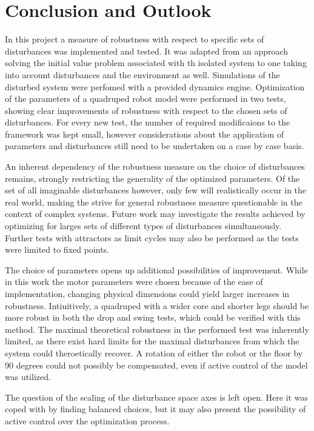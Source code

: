 \chapter{Conclusion and Outlook}


In this project a measure of robustness with respect to specific sets of disturbances was implemented and tested. It was adapted from an approach solving the initial value problem associated with th isolated system to one taking into account disturbances and the environment as well. Simulations of the disturbed system were perfomed with a provided dynamics engine. Optimization of the parameters of a quadruped robot model were performed in two tests, showing clear improvements of robustness with respect to the chosen sets of disturbances. 
For every new test, the number of required modificaions to the framework was kept small, however considerations about the application of parameters and disturbances still need to be undertaken on a case by case basis. 

An inherent dependency of the robustness measure on the choice of disturbances remains, strongly restricting the generality of the optimized parameters. Of the set of all imaginable disturbances however, only few will realistically occur in the real world, making the strive for general robustness measure questionable in the context of complex systems. Future work may investigate the results achieved by optimizing for larges sets of different types of disturbances simultaneously. Further tests with attractors as limit cycles may also be performed as the tests were limited to fixed points. 

The choice of parameters opens up additional possibilities of improvement. While in this work the motor parameters were chosen because of the ease of implementation, changing physical dimensions could yield larger increases in robustness. Intiuitively, a quadruped with a wider core and shorter legs should be more robust in both the drop and swing tests, which could be verified with this method. The maximal theoretical robustness in the performed test was inherently limited, as there exist hard limits for the maximal disturbances from which the system could theroetically recover. A rotation of either the robot or the floor by 90 degrees could not possibly be compensated, even if active control of the model was utilized. 

The question of the scaling of the disturbance space axes is left open. Here it was coped with by finding balanced choices, but it may also present the possibility of active control over the optimization process.  

